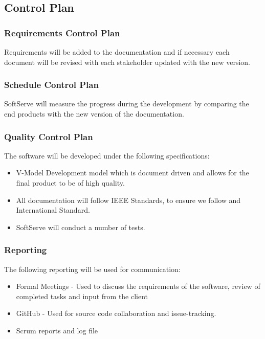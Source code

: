 \documentclass[12pt]{article}
\begin{document}
\begin{center}
\begin{longtable}{|p{3cm}|p{3cm}|p{9cm}|}
\end{longtable}
\end{center}

\subsection{Control Plan}
\subsubsection{Requirements Control Plan}
Requirements will be added to the documentation and if necessary each document will be revised with each stakeholder updated with the new version.

\subsubsection{Schedule Control Plan}
SoftServe will measure the progress during the development by comparing the end products with the new version of the documentation.

\subsubsection{Quality Control Plan}
The software will be developed under the following specifications:
\begin{itemize}
\item V-Model Development model which is document driven and allows for the final product to be of high quality.
\item All documentation will follow IEEE Standards, to ensure we follow and International Standard.
\item SoftServe will conduct a number of tests.
\end{itemize}

\subsubsection{Reporting}
The following reporting will be used for communication:
\begin{itemize}
\item Formal Meetings - Used to discuss the requirements of the software, review of completed tasks and input from the client
\item GitHub - Used for source code collaboration and issue-tracking.
\item Scrum reports and log file
\end{itemize}
\end{document}

